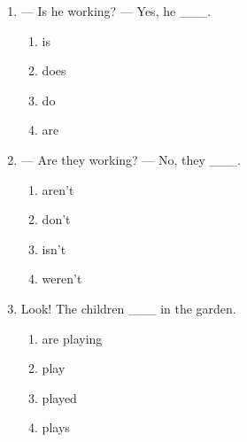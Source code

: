 \documentclass[11pt,a4paper]{ctexart}
\begin{document}
\begin{enumerate}[leftmargin=*,itemsep=4pt]
\begin{enumerate}[label=\Alph*.,leftmargin=2em,itemsep=1pt,topsep=2pt]
\item Did
\item Is
\end{enumerate}
\item — Is he working? — Yes, he \_\_\_.
\begin{enumerate}[label=\Alph*.,leftmargin=2em,itemsep=1pt,topsep=2pt]
\item is
\item does
\item do
\item are
\end{enumerate}
\item — Are they working? — No, they \_\_\_.
\begin{enumerate}[label=\Alph*.,leftmargin=2em,itemsep=1pt,topsep=2pt]
\item aren’t
\item don’t
\item isn’t
\item weren’t
\end{enumerate}
\item Look! The children \_\_\_ in the garden.
\begin{enumerate}[label=\Alph*.,leftmargin=2em,itemsep=1pt,topsep=2pt]
\item are playing
\item play
\item played
\item plays
\end{enumerate}
\end{enumerate}
\end{document}
